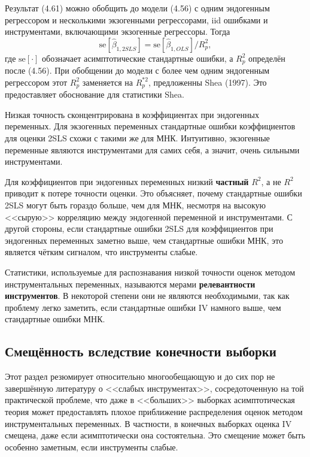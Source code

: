 Результат (4.61) можно обобщить до модели (4.56) с одним эндогенным регрессором и несколькими экзогенными регрессорами, iid ошибками и инструментами, включающими экзогенные регрессоры. Тогда
\begin{equation}
\mathrm{se}[\hat{\beta}_{1,2SLS}] = \mathrm{se}[\hat{\beta}_{1,OLS}]/R^2_p,
\end{equation}
где $\mathrm{se}[\cdot]$ обозначает асимптотические стандартные ошибки, а $R^2_p$ определён после (4.56). При обобщении до модели с более чем одним эндогенным регрессором этот $R^2_p$ заменяется на $R^{*2}_p$, предложенны Shea (1997). Это предоставляет обоснование для статистики Shea.

Низкая точность сконцентрирована в коэффициентах при эндогенных переменных. Для экзогенных переменных стандартные ошибки коэффициентов для оценки 2SLS схожи с такими же для МНК. Интуитивно, экзогенные переменные являются инструментами для самих себя, а значит, очень сильными инструментами.

Для коэффициентов при эндогенных переменных низкий \textbf{частный} $R^2$, а не $R^2$ приводит к потере точности оценки. Это объясняет, почему стандартные ошибки 2SLS могут быть гораздо больше, чем для МНК, несмотря на высокую <<сырую>> корреляцию между эндогенной переменной и инструментами. С другой стороны, если стандартные ошибки 2SLS для коэффициентов при эндогенных переменных заметно выше, чем стандартные ошибки МНК, это является чётким сигналом, что инструменты слабые.

Статистики, используемые для распознавания низкой точности оценок методом инструментальных переменных, называются мерами \textbf{релевантности инструментов}. В некоторой степени они не являются необходимыми, так как проблему легко заметить, если стандартные ошибки IV намного выше, чем стандартные ошибки МНК.

\subsection{Смещённость вследствие конечности выборки}

Этот раздел резюмирует относительно многообещающую и до сих пор не завершённую литературу о <<слабых инструментах>>, сосредоточенную на той практической проблеме, что даже в <<больших>> выборках асимптотическая теория может предоставлять плохое приближение распределения оценок методом инструментальных переменных. В частности, в конечных выборках оценка IV смещена, даже если асимптотически она состоятельна. Это смещение может быть особенно заметным, если инструменты слабые.

